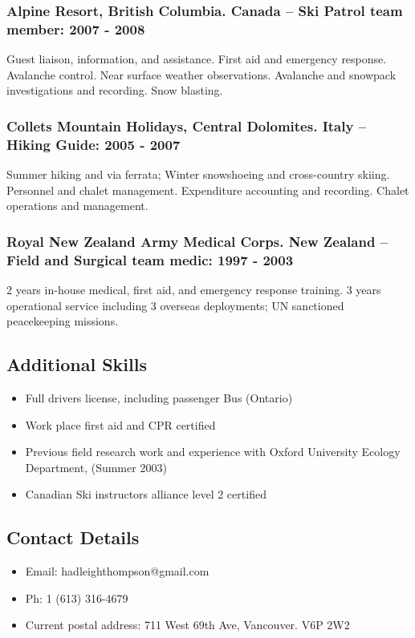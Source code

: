 \documentclass[]{article}
\begin{document}
\subsubsection*{Alpine Resort, British Columbia. Canada – Ski Patrol team member: 2007 - 2008}
Guest liaison, information, and assistance. First aid and emergency response. Avalanche control. Near surface weather observations. Avalanche and snowpack investigations and recording. Snow blasting.
\subsubsection*{Collets Mountain Holidays, Central Dolomites. Italy – Hiking Guide: 2005 - 2007}
Summer hiking and via ferrata; Winter snowshoeing and cross-country skiing. Personnel and chalet management. Expenditure accounting and recording. Chalet operations and management.
\subsubsection*{Royal New Zealand Army Medical Corps. New Zealand – Field and Surgical team medic: 1997 - 2003}
2 years in-house medical, first aid, and emergency response training. 3 years operational service including 3 overseas deployments; UN sanctioned peacekeeping missions.

\subsection*{Additional Skills}
\begin{itemize}
\item Full drivers license, including passenger Bus (Ontario)
\item Work place first aid and CPR certified
\item Previous field research work and experience with Oxford University Ecology Department, (Summer 2003)
\item Canadian Ski instructors alliance level 2 certified
\end{itemize}


\subsection*{Contact Details}
\begin{itemize}
\item Email: hadleighthompson@gmail.com
\item Ph: 1 (613) 316-4679
\item Current postal address: 711 West 69th Ave, Vancouver. V6P 2W2
\end{itemize}
\end{document}

